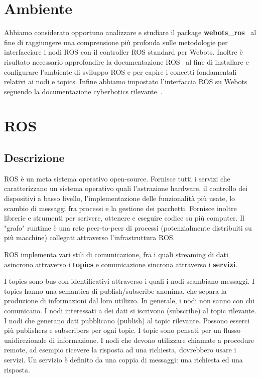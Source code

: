 \documentclass[a4paper]{article}
\begin{document}
	\section{Ambiente}\label{sec:Ambiente} 

	Abbiamo considerato opportuno analizzare e studiare il package
	\textbf{webots\_ros}~\cite{cyberbotics} al fine di raggiungere una
	comprensione più profonda sulle metodologie per interfacciare i nodi ROS
	con il controller ROS standard per Webots. Inoltre è risultato necessario
	approfondire la documentazione ROS~\cite{ros.org} al fine di installare e
	configurare l'ambiente di sviluppo ROS e per capire i concetti fondamentali
	relativi ai nodi e topics. Infine abbiamo impostato l'interfaccia ROS su
	Webots seguendo la documentazione cyberbotics
	rilevante~\cite{webotsRosSetup}.  

	\section{ROS}\label{sec:Ros}
	\subsection{Descrizione}\label{subsec:Descrizione}
	ROS \cite{ros.org} è un meta sistema operativo open-source. Fornisce tutti
	i servizi che caratterizzano un sistema operativo quali l'astrazione
	hardware, il controllo dei dispositivi a basso livello,
	l'implementazione delle funzionalità più usate, lo scambio di messaggi fra
	processi e la gestione dei pacchetti. Fornisce inoltre librerie e strumenti
	per scrivere, ottenere e eseguire codice su più computer. Il "grafo"
	runtime è una rete peer-to-peer di processi (potenzialmente distribuiti su
	più macchine) collegati attraverso l'infrastruttura ROS. 
	
	ROS implementa vari stili di comunicazione, fra i quali streaming di dati
	asincrono attraverso i \textbf{topics} e comunicazione sincrona attraverso
	i \textbf{servizi}. 

	I topics sono bus con identificativi attraverso i quali i nodi scambiano
	messaggi. I topics hanno una semantica di publish/subscribe anonima, che
	separa la produzione di informazioni dal loro utilizzo. In generale, i nodi
	non sanno con chi comunicano. I nodi interessati a dei dati si iscrivono
	(subscribe) al topic rilevante. I nodi che generano dati pubblicano
	(publish) al topic rilevante. Possono esserci più publishers e subscribers
	per ogni topic. I topic sono pensati per un flusso unidirezionale di
	informazione. I nodi che devono utilizzare chiamate a procedure remote, ad
	esempio ricevere la risposta ad una richiesta, dovrebbero usare i servizi.
	Un servizio è definito da una coppia di messaggi: una richiesta ed una
	risposta. 
	
\end{document}
